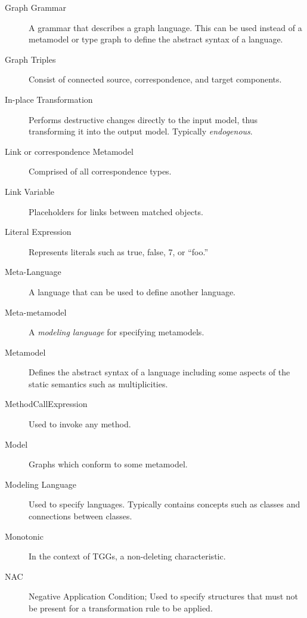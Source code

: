 \begin{description}
\item[Graph Grammar] %
A grammar that describes a graph language. This can be used instead of a metamodel or type graph to define the abstract syntax of a language.

\item[Graph Triples] %
Consist of connected source, correspondence, and target components.

\item[In-place Transformation] 
Performs destructive changes directly to the input model, thus transforming it into the output model. Typically \emph{endogenous}.

\item[Link or correspondence Metamodel] %
Comprised of all correspondence types.

\item[Link Variable] %
Placeholders for links between matched objects.

\item[Literal Expression] %
Represents literals such as true, false, 7, or ``foo.''

\item[Meta-Language] %
A language that can be used to define another language.

\item[Meta-metamodel] %
A \emph{modeling language} for specifying metamodels.

\item[Metamodel] %
Defines the abstract syntax of a language including some aspects of the static semantics such as multiplicities. 

\item[MethodCallExpression] %
Used to invoke any method.

\item[Model] %
Graphs which conform to some metamodel.

\item[Modeling Language] %
Used to specify languages. Typically contains concepts such as classes and connections between classes.

\item[Monotonic] %
In the context of TGGs, a non-deleting characteristic.

\item[NAC] %
Negative Application Condition; Used to specify structures that must not be present for a transformation rule to be applied.


\end{description}
